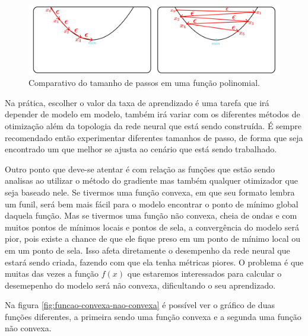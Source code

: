 \begin{figure}[h!]
    \centering
    \includegraphics[width=1\linewidth]{../imagens/retropropagacao-gradiente/comparativo-de-passos.png}
    \caption{Comparativo do tamanho de passos em uma função polinomial.}
    \label{fig:comparativo-tamanho-do-passo}
\end{figure}

Na prática, escolher o valor da taxa de aprendizado é uma tarefa que irá depender de modelo em modelo, também irá variar com os diferentes métodos de otimização além da topologia da rede neural que está sendo construída. É sempre recomendado então experimentar diferentes tamanhos de passo, de forma que seja encontrado um que melhor se ajusta ao cenário que está sendo trabalhado.

Outro ponto que deve-se atentar é com relação as funções que estão sendo analisas ao utilizar o método do gradiente mas também qualquer otimizador que seja baseado nele. Se tivermos uma função convexa, em que seu formato lembra um funil, será bem mais fácil para o modelo encontrar o ponto de mínimo global daquela função. Mas se tivermos uma função não convexa, cheia de ondas e com muitos pontos de mínimos locais e pontos de sela, a convergência do modelo será pior, pois existe a chance de que ele fique preso em um ponto de mínimo local ou em um ponto de sela. Isso afeta diretamente o desempenho da rede neural que estará sendo criada, fazendo com que ela tenha métricas piores. O problema é que muitas das vezes a função $f(x)$ que estaremos interessados para calcular o desemepenho do modelo será não convexa, dificultando o seu aprendizado.

Na figura \ref{fig:funcao-convexa-nao-convexa} é possível ver o gráfico de duas funções diferentes, a primeira sendo uma função convexa e a segunda uma função não convexa.

